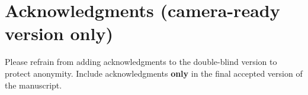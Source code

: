 \documentclass[10pt,letterpaper]{article}
\begin{document}
\section{Acknowledgments (camera-ready version only)}
Please refrain from adding acknowledgments to the double-blind version to protect anonymity. Include acknowledgments \textbf{only} in the final accepted version of the manuscript. 

\nocite{Serre2018a}
\nocite{Serre2018b}
\nocite{LRA}
\nocite{Amos}
\nocite{Wightman}
\nocite{Dosovitskiy}
\nocite{Miralles}
\nocite{Houtkamp}
\nocite{Gu}



\newpage




\setlength{\bibleftmargin}{.125in}
\setlength{\bibindent}{-\bibleftmargin}


\end{document}

